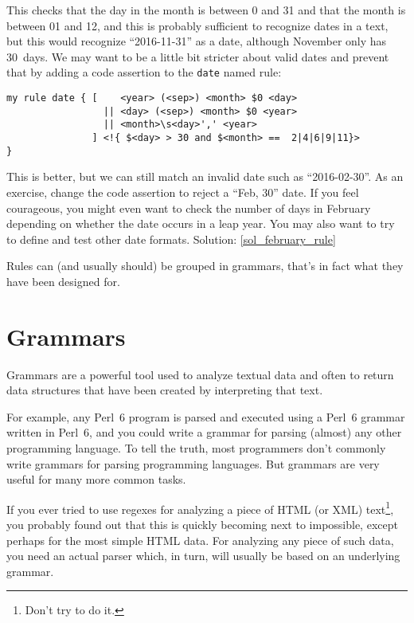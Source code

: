 This checks that the day in the month is between 0 and 31 
and that the month is between 01 and 12, and this is 
probably sufficient to recognize dates in a 
text, but this would recognize ``2016-11-31'' as a date, 
although November only has 30~days. We may want to be a 
little bit stricter about valid dates and prevent that
by adding a code assertion to the {\tt date} named rule:

\begin{verbatim}
my rule date { [    <year> (<sep>) <month> $0 <day> 
                 || <day> (<sep>) <month> $0 <year> 
                 || <month>\s<day>',' <year>
               ] <!{ $<day> > 30 and $<month> ==  2|4|6|9|11}>
}                         
\end{verbatim}

\begin{exercise}
\label{february_rule}
This is better, but we can still match an invalid date 
such as ``2016-02-30''. As an exercise, change the code 
assertion to reject a ``Feb, 30'' date. If you feel 
courageous, you might even want to check the number of 
days in February depending on whether the date occurs in 
a leap year. You may also want to try to define and test 
other date formats. Solution: \ref{sol_february_rule}
\end{exercise}

Rules can (and usually should) be grouped in 
grammars, that's in fact what they have been designed 
for.

\section{Grammars}

Grammars are a powerful tool used to analyze textual data 
and often to return data structures that have been 
created by interpreting that text.

For example, any Perl~6 program is parsed and executed 
using a Perl~6 grammar written in Perl~6, and you could write a grammar 
for parsing (almost) any other programming language. 
To tell the truth, most programmers don't commonly 
write grammars for parsing programming languages. But 
grammars are very useful for many more common tasks.


If you ever tried to use regexes for analyzing a piece 
of HTML (or XML) text\footnote{Don't try to do it.}, you 
probably found out that this is quickly becoming next 
to impossible, except perhaps for the most simple 
HTML data. For analyzing any piece of such data, you 
need an actual parser which, in turn, will usually be 
based on an underlying grammar.

